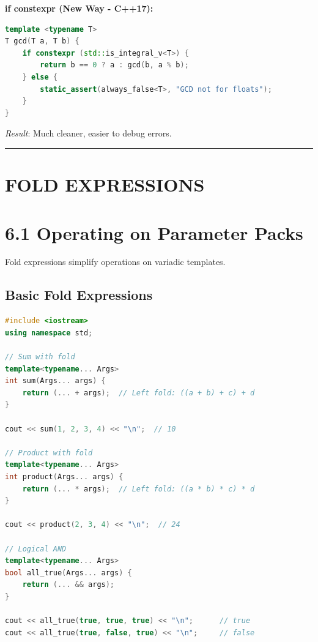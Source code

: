 \textbf{if constexpr (New Way - C++17):}

\begin{lstlisting}[language={C++}]
template <typename T>
T gcd(T a, T b) {
    if constexpr (std::is_integral_v<T>) {
        return b == 0 ? a : gcd(b, a % b);
    } else {
        static_assert(always_false<T>, "GCD not for floats");
    }
}
\end{lstlisting}

\emph{Result}: Much cleaner, easier to debug errors.

\begin{center}\rule{0.5\linewidth}{0.5pt}\end{center}

\hypertarget{fold-expressions}{%
\section{FOLD EXPRESSIONS}\label{fold-expressions}}

\hypertarget{operating-on-parameter-packs}{%
\section{6.1 Operating on Parameter
Packs}\label{operating-on-parameter-packs}}

Fold expressions simplify operations on variadic templates.

\hypertarget{basic-fold-expressions}{%
\subsection{Basic Fold Expressions}\label{basic-fold-expressions}}

\begin{lstlisting}[language={C++}]
#include <iostream>
using namespace std;

// Sum with fold
template<typename... Args>
int sum(Args... args) {
    return (... + args);  // Left fold: ((a + b) + c) + d
}

cout << sum(1, 2, 3, 4) << "\n";  // 10

// Product with fold
template<typename... Args>
int product(Args... args) {
    return (... * args);  // Left fold: ((a * b) * c) * d
}

cout << product(2, 3, 4) << "\n";  // 24

// Logical AND
template<typename... Args>
bool all_true(Args... args) {
    return (... && args);
}

cout << all_true(true, true, true) << "\n";      // true
cout << all_true(true, false, true) << "\n";     // false
\end{lstlisting}

